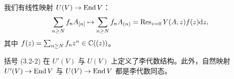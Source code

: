 我们有线性映射 $U(V)\to\operatorname{End} V$：
\[
    \sum_{n\ge N} f_n A_{[n]} \mapsto \sum_{n\ge N} f_n A_{(n)}
    = \operatorname{Res}_{z=0} Y(A,z)f(z)\mathrm{d} z,
\]
其中 $f(z)=\sum_{n\ge N}f_n z^n\in\mathbb{C}((z))$。


\begin{proposition}
    括号 (3.2-2) 在 $U'(V)$ 与 $U(V)$ 上定义了李代数结构。此外，自然映射 $U'(V)\to\operatorname{End} V$ 与 $U(V)\to\operatorname{End} V$ 都是李代数同态。
\end{proposition}


